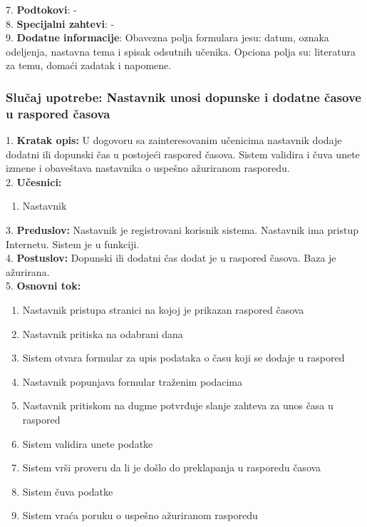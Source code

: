 \documentclass{article}
\begin{document}
7. \textbf{Podtokovi}: - \\

8. \textbf{Specijalni zahtevi}: - \\

9. \textbf{Dodatne informacije}: Obavezna polja formulara jesu: datum, oznaka odeljenja, nastavna tema i spisak odsutnih učenika. Opciona polja su: literatura za temu, domaći zadatak i napomene. \\


\subsubsection{Slučaj upotrebe: Nastavnik unosi dopunske i dodatne časove u raspored časova } 
1. \textbf{Kratak opis:} U dogovoru sa zainteresovanim učenicima nastavnik dodaje dodatni ili dopunski čas u postojeći raspored časova. Sistem validira i čuva unete izmene i obaveštava nastavnika o uspešno ažuriranom rasporedu. \\

2. \textbf{Učesnici:}
\begin{enumerate} [label=(\alph*)]
\item Nastavnik
\end{enumerate} 

3. \textbf{Preduslov:} Nastavnik je registrovani korisnik sistema. Nastavnik ima pristup Internetu. Sistem je u funkciji. \\

4. \textbf{Postuslov:} Dopunski ili dodatni čas dodat je u raspored časova. Baza je ažurirana. \\

5. \textbf{Osnovni tok:} 
\begin{enumerate} [label=(\alph*)]
\item Nastavnik pristupa stranici na kojoj je prikazan raspored časova
\item Nastavnik pritiska na odabrani dana  
\item Sistem otvara formular za upis podataka o času koji se dodaje u raspored
\item Nastavnik popunjava formular traženim podacima
\item Nastavnik pritiskom na dugme potvrđuje slanje zahteva za unos časa u raspored
\item Sistem validira unete podatke
\item Sistem vrši proveru da li je došlo do preklapanja u rasporedu časova
\item Sistem čuva podatke
\item Sistem vraća poruku o uspešno ažuriranom rasporedu
\end{enumerate}
\end{document}
